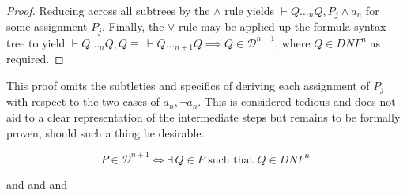 \begin{proof}
        Reducing across all subtrees by the $\wedge$ rule yields $\vdash Q \ldots_n Q, P_j \wedge a_n$ for some assignment $P_j$.
        Finally, the $\vee$ rule may be applied up the formula syntax tree to yield $\vdash Q \ldots_{n} Q, Q \equiv \, \vdash Q \ldots_{n+1} Q \implies Q \in \mathcal{D}^{n+1}$, where $Q \in \textit{DNF}^n$ as required.
    \end{proof}

    \begin{remark} \label{remark:proof-subtleties}
        This proof omits the subtleties and specifics of deriving each assignment of $P_j$ with respect to the two cases of $a_n, \neg a_n$.
        This is considered tedious and does not aid to a clear representation of the intermediate steps but remains to be formally proven, should such a thing be desirable.
    \end{remark}

    \begin{proposition*}
        
        \begin{equation*}
            P \in \mathcal{D}^{n+1} \iff \exists \, Q \in P \text{ such that } Q \in DNF^{n}
        \end{equation*}
    \end{proposition*}

    
    \begin{remarks}
        \citet{tableaux-for-logic-of-proofs} and
        \citet{connection-based-proof-method} and
        \citet{matrices-with-connections} and
        \citet{proving-by-matings}
    \end{remarks}
